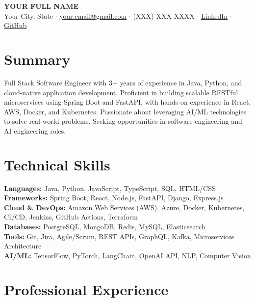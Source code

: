 \documentclass[11pt,letterpaper]{article}
\begin{document}
\begin{center}
    {\LARGE \textbf{YOUR FULL NAME}} \\[2pt]
    \small
    Your City, State $\cdot$
    \href{mailto:your.email@gmail.com}{your.email@gmail.com} $\cdot$
    (XXX) XXX-XXXX $\cdot$
    \href{https://linkedin.com/in/yourprofile}{LinkedIn} $\cdot$
    \href{https://github.com/yourusername}{GitHub}
\end{center}

\section{Summary}
Full Stack Software Engineer with 3+ years of experience in Java, Python, and
cloud-native application development. Proficient in building scalable RESTful
microservices using Spring Boot and FastAPI, with hands-on experience in React,
AWS, Docker, and Kubernetes. Passionate about leveraging AI/ML technologies
to solve real-world problems. Seeking opportunities in software engineering
and AI engineering roles.

\section{Technical Skills}
\textbf{Languages:} Java, Python, JavaScript, TypeScript, SQL, HTML/CSS \\
\textbf{Frameworks:} Spring Boot, React, Node.js, FastAPI, Django, Express.js \\
\textbf{Cloud \& DevOps:} Amazon Web Services (AWS), Azure, Docker, Kubernetes, CI/CD, Jenkins, GitHub Actions, Terraform \\
\textbf{Databases:} PostgreSQL, MongoDB, Redis, MySQL, Elasticsearch \\
\textbf{Tools:} Git, Jira, Agile/Scrum, REST APIs, GraphQL, Kafka, Microservices Architecture \\
\textbf{AI/ML:} TensorFlow, PyTorch, LangChain, OpenAI API, NLP, Computer Vision

\section{Professional Experience}
\end{document}
